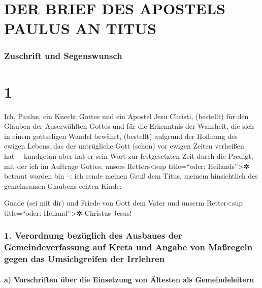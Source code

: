 \hypertarget{der-brief-des-apostels-paulus-an-titus}{%
\section{DER BRIEF DES APOSTELS PAULUS AN
TITUS}\label{der-brief-des-apostels-paulus-an-titus}}

\hypertarget{zuschrift-und-segenswunsch}{%
\subsubsection{Zuschrift und
Segenswunsch}\label{zuschrift-und-segenswunsch}}

\hypertarget{section}{%
\section{1}\label{section}}

 Ich, Paulus, ein Knecht Gottes und ein Apostel Jesu
Christi, (bestellt) für den Glauben der Auserwählten Gottes und für die
Erkenntnis der Wahrheit, die sich in einem gottseligen Wandel bewährt,
 (bestellt) aufgrund der Hoffnung des ewigen Lebens, das
der untrügliche Gott (schon) vor ewigen Zeiten verheißen hat~--
 kundgetan aber hat er sein Wort zur festgesetzten Zeit
durch die Predigt, mit der ich im Auftrage Gottes, unsers
Retters\textless sup title=``oder: Heilands''\textgreater✲ betraut
worden bin --:  ich sende meinen Gruß dem Titus, meinem
hinsichtlich des gemeinsamen Glaubens echten Kinde:

Gnade (sei mit dir) und Friede von Gott dem Vater und unserm
Retter\textless sup title=``oder: Heiland''\textgreater✲ Christus Jesus!

\hypertarget{verordnung-bezuxfcglich-des-ausbaues-der-gemeindeverfassung-auf-kreta-und-angabe-von-mauxdfregeln-gegen-das-umsichgreifen-der-irrlehren}{%
\subsubsection{1. Verordnung bezüglich des Ausbaues der
Gemeindeverfassung auf Kreta und Angabe von Maßregeln gegen das
Umsichgreifen der
Irrlehren}\label{verordnung-bezuxfcglich-des-ausbaues-der-gemeindeverfassung-auf-kreta-und-angabe-von-mauxdfregeln-gegen-das-umsichgreifen-der-irrlehren}}

\hypertarget{a-vorschriften-uxfcber-die-einsetzung-von-uxe4ltesten-als-gemeindeleitern}{%
\paragraph{a) Vorschriften über die Einsetzung von Ältesten als
Gemeindeleitern}\label{a-vorschriften-uxfcber-die-einsetzung-von-uxe4ltesten-als-gemeindeleitern}}

